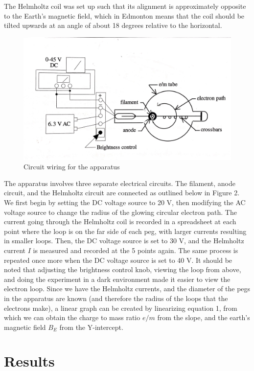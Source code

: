 \documentclass[letterpaper]{article}
\begin{document}
The Helmholtz coil was set up such that its alignment is approximately
opposite to the Earth's magnetic field, which in Edmonton means that the coil
should be tilted upwards at an angle of about 18 degrees relative to the horizontal.
\begin{figure}[h!]
    \centering
    \includegraphics[width=.9\textwidth]{fig2.jpg}
    \caption{Circuit wiring for the apparatus \cite{labmanual}}
\end{figure}
The apparatus involves three separate electrical circuits.
The filament, anode circuit, and the Helmholtz circuit are connected as outlined
below in Figure 2. We first begin by setting the DC voltage source to 20 V, then modifying the
AC voltage source to change the radius of the glowing circular electron path. The current going through the
Helmholtz coil is recorded in a spreadsheet at each point where the loop is on the far side of each peg, with larger
currents resulting in smaller loops. Then,
the DC voltage source is set to 30 V, and the Helmholtz current $I$ is measured and recorded at the 5 points again.
The same process is repeated once more when the DC voltage source is set to 40 V. It should be noted
that adjusting the brightness control knob, viewing the loop from above, and doing the experiment in a dark
environment made it easier to view the electron loop.
Since we have the Helmholtz currents, and the diameter of the pegs in the apparatus are known (and therefore
the radius of the loops that the electrons make), a linear graph can be created by linearizing equation 1,
from which we can obtain the charge to mass ratio $e/m$ from the slope, and the earth's magnetic field $B_E$
from the Y-intercept.

\section{Results}
\end{document}
